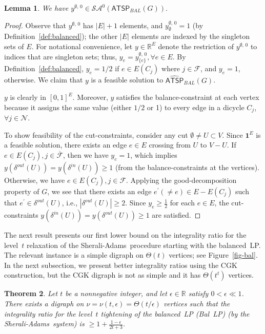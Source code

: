 \documentclass[11pt]{article}
\newtheorem{theorem}{Theorem}[section]
\newtheorem{lemma}[theorem]{Lemma}
\newcommand{\sa}{\textsf{Sherali-Adams}}
\newcommand \reals {\mathbb{R}}
\newcommand{\atspbal}{\homog{\textsf{ATSP$_{\mathit{BAL}}$}}}
\newcommand{\atspbalpolytope}{\widehat{\textsf{ATSP}}_{\mathit{BAL}}}
\newcommand{\cindset}{\mathcal{N}}
\newcommand{\fracset}{\mathcal{F}}
\newcommand{\notfracset}{\overline{\mathcal{F}}}
\newcommand{\yvec}[2]{y^{#1,\,#2}}	\newcommand{\zvec}[2]{y^{#1,\,#2}}	\newcommand{\zveconly}{y}
\newcommand{\saop}{\mathcal{SA}}
\newcommand{\homog}[1]{{#1}}
\begin{document}
\begin{lemma}
\label{lemma:base}
We have \qquad
$\displaystyle 
\yvec{\emptyset}{0} \in \saop^{0}(\homog{\atspbal(G)}).
$
\end{lemma}
\begin{proof}
Observe that $\yvec{\emptyset}{0}$ has $|E|+1$ elements,
and $\yvec{\emptyset}{0}_{\emptyset} =1$
(by Definition~\ref{def:balanced});
the other $|E|$ elements are indexed by
the singleton sets of $E$.
For notational convenience, let $y \in \reals^{E}$ denote
the restriction of $\yvec{\emptyset}{0}$ to
indices that are singleton sets;
thus, $y_e = \yvec{\emptyset}{0}_{\{e\}}, \forall e\in{E}$.
By Definition~\ref{def:balanced},
$y_e =1/2$ if $e\in E(C_j)$ where $j\in\fracset$,
and $y_e=1$, otherwise.
We claim that $y$ is a feasible solution to $\atspbalpolytope(G)$.

$y$ is clearly in $[0, 1]^{E}$.
Moreover, $y$ satisfies the balance-constraint at each vertex because it
assigns the same value (either $1/2$ or 1) to every edge in a dicycle
$C_j$, $\forall j\in\cindset$.


To show feasibility of the cut-constraints, consider any cut $\emptyset\neq
U\subset V$. Since $\textbf{1}^{E}$ is a feasible solution, there
exists an edge $e\in E$ crossing from $U$ to $V-U$. If $e\in E(C_j),
j\in\notfracset$, then we have $y_e=1$, which implies
$y(\delta^{out}(U))=y(\delta^{in}(U))\geq 1$
(from the balance-constraints at the vertices).
 Otherwise, we have $e\in E(C_j), j\in\fracset$.
Applying the good-decomposition property of $G$,
we see that there exists an edge
$e^{\prime} (\neq e) \in E - E(C_{j}) $ such that $e^{\prime}\in
\delta^{out}(U)$, i.e., $|\delta^{out}(U)|\geq 2$. Since $y_e\geq
\frac{1}{2}$ for each $e\in E$, the  cut-constraints
$y(\delta^{in}(U))=y(\delta^{out}(U))\geq 1$ are satisfied.
\end{proof}

The next result presents our first lower bound on the integrality ratio for
the level~$t$ relaxation of the \sa\ procedure starting with the balanced~LP.
The relevant instance is a simple digraph on $\Theta(t)$ vertices;
see Figure~\ref{fig-bal}.
In the next subsection, we present better integrality ratios
using the CGK construction,
but the CGK digraph is not as simple and it has $\Theta(t^t)$ vertices.

\begin{theorem}\label{thm:sgbalIR}
Let $t$ be a nonnegative integer, and let $\epsilon\in\reals$
satisfy $0<\epsilon\ll{1}$.
There exists a digraph on $\nu=\nu(t,\epsilon)=\Theta(t/\epsilon)$ vertices
such that the integrality ratio for
the level~$t$ tightening of the balanced~LP (Bal~LP)
(by the \sa\ system)
is $\geq 1+\frac{1-\epsilon}{2t+3}$.
\end{theorem}
\end{document}
